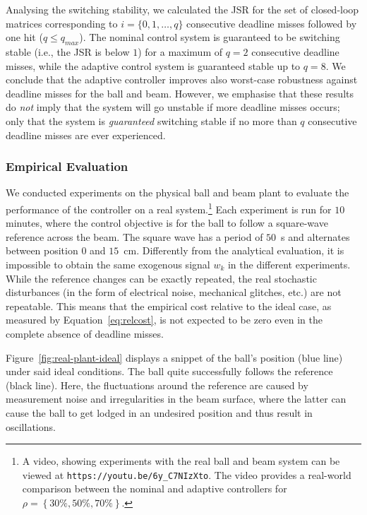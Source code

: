 Analysing the switching stability, we calculated the JSR for the set of closed-loop matrices corresponding to $i = \{0,1,\ldots,q\}$ consecutive deadline misses followed by one hit ($q \leq q_{max}$).
The nominal control system is guaranteed to be switching stable (i.e., the JSR is below $1$) for a maximum of $q=2$ consecutive deadline misses, while the adaptive control system is guaranteed stable up to $q=8$. 
We conclude that the adaptive controller improves also worst-case robustness against deadline misses for the ball and beam.
However, we emphasise that these results do \emph{not} imply that the system will go unstable if more deadline misses occurs; only that the system is \emph{guaranteed} switching stable if no more than $q$ consecutive deadline misses are ever experienced.

\subsubsection*{Empirical Evaluation}
We conducted experiments on the physical ball and beam plant to evaluate the performance of the controller on a real system.\footnote{A video, showing experiments with the real ball and beam system can be viewed at \texttt{https://youtu.be/6y\_C7NIzXto}. The video provides a real-world comparison between the nominal and adaptive controllers for $\rho = \left\{30\%, 50\%, 70\%\right\}$.}
Each experiment is run for $10$ minutes, where the control objective is for the ball to follow a square-wave reference across the beam.
The square wave has a period of $50$~s and alternates between position $0$ and $15$~cm.
Differently from the analytical evaluation, it is impossible to obtain the same exogenous signal $w_k$ in the different experiments.
While the reference changes can be exactly repeated, the real stochastic disturbances (in the form of electrical noise, mechanical glitches, etc.) are not repeatable.
This means that the empirical cost relative to the ideal case, as measured by Equation~\eqref{eq:relcost}, is not expected to be zero even in the complete absence of deadline misses.

Figure~\ref{fig:real-plant-ideal} displays a snippet of the ball's position (blue line) under said ideal conditions.
The ball quite successfully follows the reference (black line). 
Here, the fluctuations around the reference are caused by measurement noise and irregularities in the beam surface, where the latter can cause the ball to get lodged in an undesired position and thus result in oscillations.

